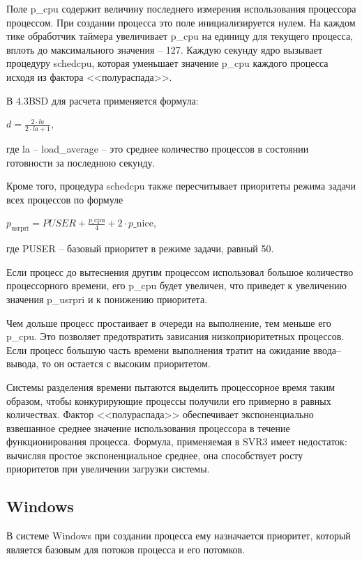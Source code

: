 Поле p\_cpu содержит величину последнего измерения использования процессора процессом. При создании процесса это поле инициализируется нулем. На каждом тике обработчик таймера увеличивает p\_cpu на единицу для текущего процесса, вплоть до максимального значения -- 127. Каждую секунду ядро вызывает процедуру schedcpu, которая уменьшает значение p\_cpu каждого процесса исходя из фактора <<полураспада>>.

В 4.3BSD для расчета применяется формула:

\begin{center}
	\( d = \frac{2 \cdot la}{2 \cdot la + 1} \),
\end{center}
где la -- load\_average -- это среднее количество процессов в состоянии готовности за последнюю секунду.

Кроме того, процедура schedcpu также пересчитывает приоритеты режима задачи всех процессов по формуле

\begin{center}
	\( p_{\text{usrpri}} = PUSER + \frac{p{\text{\_cpu}}}{4} + 2 \cdot p{\text{\_nice}} \),
\end{center}
где PUSER -- базовый приоритет в режиме задачи, равный 50.

Если процесс до вытеснения другим процессом использовал большое количество процессорного времени, его p\_cpu будет увеличен, что приведет к увеличению значения p\_usrpri и к понижению приоритета.

Чем дольше процесс простаивает в очереди на выполнение, тем меньше его p\_cpu. Это позволяет предотвратить зависания низкоприоритетных процессов. 
Если процесс большую часть времени выполнения тратит на ожидание ввода--вывода, то он остается с высоким приоритетом.

Системы разделения времени пытаются выделить процессорное время таким образом, чтобы конкурирующие процессы получили его примерно в равных количествах. Фактор <<полураспада>> обеспечивает экспоненциально взвешанное среднее значение использования процессора в течение функционирования процесса. Формула, применяемая в SVR3 имеет недостаток: вычисляя простое экспоненциальное среднее, она способствует росту приоритетов при увеличении загрузки системы.

\subsection{Windows}

В системе Windows при создании процесса ему назначается приоритет, который является базовым для потоков процесса и его потомков.  

